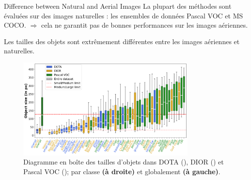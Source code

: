 \begin{subsectionframemod}{Difference between Natural and Aerial Images}
    La plupart des méthodes sont évaluées sur des images naturelles : les ensembles de données Pascal VOC et MS COCO.
    $\Rightarrow$ cela ne garantit pas de bonnes performances sur les images aériennes.
    \vspace{2mm}


    Les tailles des objets sont extrêmement différentes entre les images aériennes et naturelles.

    \begin{figure}
        \includegraphics[width=0.8\textwidth]{Figures/object_sizes.png}
    \caption{Diagramme en boîte des tailles d'objets dans DOTA (\cite{xia2018dota}), DIOR (\cite{li2020object}) et Pascal VOC (\cite{everingham2010pascal}); par classe \textbf{(à droite)} et globalement \textbf{(à gauche)}.}
    \end{figure}

    

    
\end{subsectionframemod}